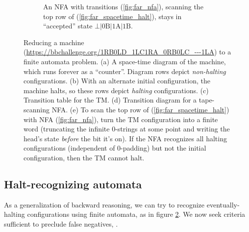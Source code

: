 \begin{figure}
\begin{subfigure}{\textwidth}
    \caption{An NFA with transitions (\ref{fig:far_nfa}), scanning the top row of (\ref{fig:far_spacetime_halt}), stays in ``accepted'' state
      $\bot|\textrm{0B}|\textrm{1A}|\textrm{1B}$.}
    \label{fig:far_scan}
  \end{subfigure}

  \caption{Reducing a machine (\url{https://bbchallenge.org/1RB0LD_1LC1RA_0RB0LC_---1LA}) to a finite automata problem.
    (a) A space-time diagram of the machine, which runs forever as a ``counter''. Diagram rows depict \emph{non-halting} configurations.
    (b) With an alternate initial configuration, the machine halts, so these rows depict \emph{halting} configurations.
    (c) Transition table for the TM.
    (d) Transition diagram for a tape-scanning NFA.
    (e) To scan the top row of (\ref{fig:far_spacetime_halt}) with NFA (\ref{fig:far_nfa}), turn the TM configuration into a finite word
        (truncating the infinite 0-strings at some point and writing the head's state \emph{before} the bit it's on).
        If the NFA recognizes all halting configurations (independent of 0-padding) but not the initial configuration, then the TM cannot halt.}
  \label{fig:finite-automata-reduction}
\end{figure}


\subsection{Halt-recognizing automata}
\label{far-defs-recognizer}
As a generalization of backward reasoning, we can try to recognize eventually-halting configurations using finite automata, as in figure \ref{fig:finite-automata-reduction}.
We now seek criteria sufficient to preclude false negatives, .

